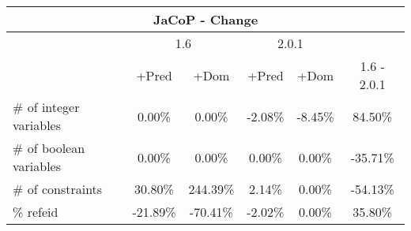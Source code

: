 \documentclass{standalone}
\begin{document}
\begin{table}[H]
\footnotesize
\begin{tabular}{lc|c|c|c|c}
\multicolumn{6}{c}{JaCoP - Change} \\ 
\hline\hline  & \multicolumn{2}{c|}{1.6} &\multicolumn{2}{c|}{2.0.1} &\\ 
\hline  & +Pred & +Dom & +Pred & +Dom & 1.6 - 2.0.1\\
\# of integer variables & 0.00\% & 0.00\% & -2.08\% & -8.45\% & 84.50\% \\ 
\# of boolean variables & 0.00\% & 0.00\% & 0.00\% & 0.00\% & -35.71\% \\ 
\# of constraints       & 30.80\% & 244.39\% & 2.14\% & 0.00\% & -54.13\% \\ 
\% refeid               & -21.89\% & -70.41\% & -2.02\% & 0.00\% & 35.80\%\\ 
\end{tabular} 
\end{table}
\end{document}
